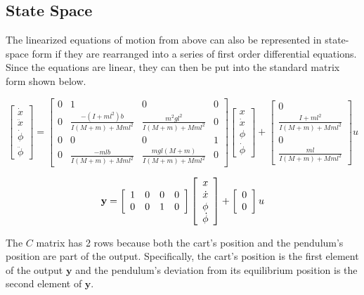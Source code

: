 \documentclass{report}
\begin{document}
\subsection{State Space}
The linearized equations of motion from above can also be represented in state-space form if they are rearranged into a series of first order differential equations. Since the equations are linear, they can then be put into the standard matrix form shown below.

$$ \left[{\begin{array}{c} \dot{x}\\ \ddot{x}\\ \dot{\phi}\\ \ddot{\phi} \end{array}}\right] = \left[{\begin{array}{cccc} 0&1&0&0\\ 0&\frac{-(I+ml^2)b}{I(M+m)+Mml^2}&\frac{m^2gl^2}{I(M+m)+Mml^2}&0\\ 0&0&0&1\\ 0&\frac{-mlb}{I(M+m)+Mml^2}&\frac{mgl(M+m)}{I(M+m)+Mml^2}&0 \end{array}}\right] \left[{\begin{array}{c} x\\ \dot{x}\\ \phi\\ \dot{\phi} \end{array}}\right]+ \left[{\begin{array}{c}0\\ \frac{I+ml^2}{I(M+m)+Mml^2}\\ 0 \\ \frac{ml}{I(M+m)+Mml^2} \end{array}}\right]u$$

$${\bf y} = \left[{\begin{array}{cccc} 1&0&0&0\\0&0&1&0 \end{array}}\right] \left[{\begin{array}{c} x\\ \dot{x}\\ \phi\\ \dot{\phi} \end{array}}\right]+ \left[{\begin{array}{c} 0\\0 \end{array}}\right]u$$

The $C$ matrix has 2 rows because both the cart's position and the pendulum's position are part of the output. Specifically, the cart's position is the first element of the output $\mathbf{y}$ and the pendulum's deviation from its equilibrium position is the second element of $\mathbf{y}$.
\end{document}
